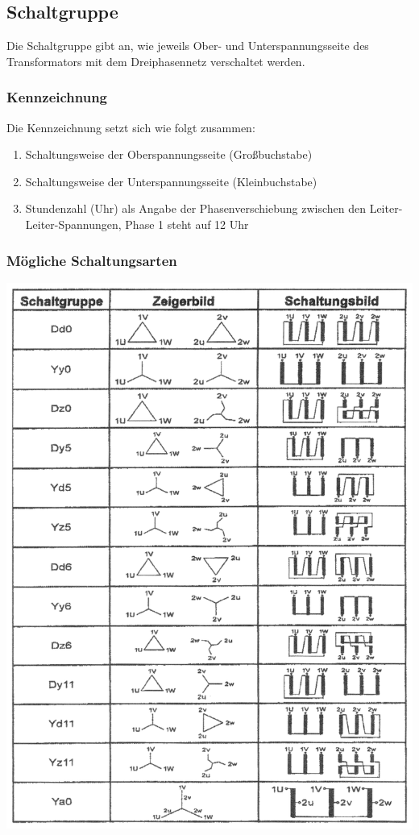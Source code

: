 \documentclass[a4paper]{article}
\begin{document}
\subsection{Schaltgruppe}
Die Schaltgruppe gibt an, wie jeweils Ober- und Unterspannungsseite des Transformators mit dem Dreiphasennetz verschaltet werden.\\

\subsubsection{Kennzeichnung}
\noindent Die Kennzeichnung setzt sich wie folgt zusammen:
\begin{enumerate}
    \item Schaltungsweise der Oberspannungsseite (Großbuchstabe)
    \item Schaltungsweise der Unterspannungsseite (Kleinbuchstabe)
    \item Stundenzahl (Uhr) als Angabe der Phasenverschiebung zwischen den Leiter-Leiter-Spannungen, Phase 1 steht auf 12 Uhr
\end{enumerate}

\subsubsection{Mögliche Schaltungsarten}
\includegraphics[width=\textwidth]{Schaltgruppe-Zeigerbild.png}
\end{document}
